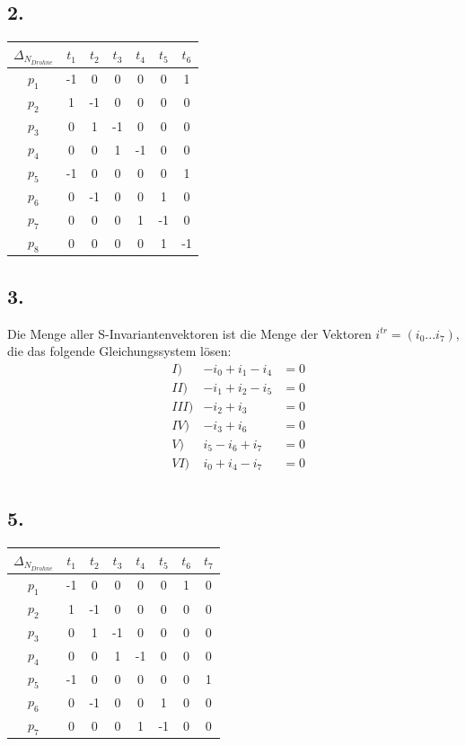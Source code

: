 \documentclass[12pt, paper=a4]{article}
\begin{document}
\subsection*{2.}
\begin{center}
\begin{tabular}{ | c | c c c c c c |}
	\hline
	$\Delta_{N_{Drohne}}$ & $t_1$ & $t_2$ & $t_3$ & $t_4$ & $t_5$ & $t_6$\\
	\hline
	$p_1$ & -1 & 0 & 0 & 0 & 0 & 1\\
	$p_2$ & 1 & -1 & 0 & 0 & 0 & 0\\
	$p_3$ & 0 & 1 & -1 & 0 & 0 & 0\\
	$p_4$ & 0 & 0 & 1 & -1 & 0 & 0\\
	$p_5$ & -1 & 0 & 0 & 0 & 0 & 1\\
	$p_6$ & 0 & -1 & 0 & 0 & 1 & 0\\
	$p_7$ & 0 & 0 & 0 & 1 & -1 & 0\\
	$p_8$ & 0 & 0 & 0 & 0 & 1 & -1\\
	\hline	
\end{tabular}
\end{center}


\subsection*{3.}
Die Menge aller S-Invariantenvektoren ist die Menge der Vektoren $i^{tr} = (i_0 ... i_7)$, die das folgende Gleichungssystem lösen:\\

\begin{align*}
&I) &-i_0 + i_1 - i_4 &= 0\\
&II) &-i_1 + i_2 - i_5 &= 0\\
&III) &-i_2 + i_3 &= 0\\
&IV) &-i_3 + i_6 &= 0\\
&V) &i_5 - i_6 + i_7 &= 0\\
&VI) &i_0 + i_4 - i_7 &= 0\\
\end{align*}

\subsection*{5.}
\begin{center}
\begin{tabular}{ | c | c c c c c c c |}
	\hline
	$\Delta_{N_{Drohne}}$ & $t_1$ & $t_2$ & $t_3$ & $t_4$ & $t_5$ & $t_6$ & $t_7$\\
	\hline
	$p_1$ & -1 & 0 & 0 & 0 & 0 & 1 & 0\\
	$p_2$ & 1 & -1 & 0 & 0 & 0 & 0 & 0\\
	$p_3$ & 0 & 1 & -1 & 0 & 0 & 0 & 0\\
	$p_4$ & 0 & 0 & 1 & -1 & 0 & 0 & 0\\
	$p_5$ & -1 & 0 & 0 & 0 & 0 & 0 & 1\\
	$p_6$ & 0 & -1 & 0 & 0 & 1 & 0 & 0\\
	$p_7$ & 0 & 0 & 0 & 1 & -1 & 0 & 0\\
	\hline	
\end{tabular}
\end{center}
\end{document}
